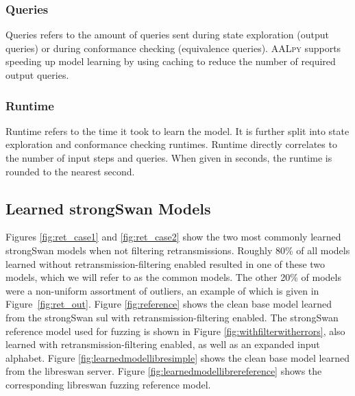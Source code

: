 \subsubsection*{Queries}
Queries refers to the amount of queries sent during state exploration (output queries) or during conformance checking (equivalence queries). \textsc{AALpy} supports speeding up model learning by using caching to reduce the number of required output queries. 

\subsubsection*{Runtime}
Runtime refers to the time it took to learn the model. It is further split into state exploration and conformance checking runtimes. Runtime directly correlates to the number of input steps and queries. When given in seconds, the runtime is rounded to the nearest second.


\subsection{Learned strongSwan Models} \label{subsec:models}
Figures \ref{fig:ret_case1} and \ref{fig:ret_case2} show the two most commonly learned strongSwan models when not filtering retransmissions. Roughly 80\% of all models learned without retransmission-filtering enabled resulted in one of these two models, which we will refer to as the common models. The other 20\% of models were a non-uniform assortment of outliers, an example of which is given in Figure~\ref{fig:ret_out}. Figure \ref{fig:reference} shows the clean base model learned from the strongSwan \ac{sul} with retransmission-filtering enabled. The strongSwan reference model used for fuzzing is shown in Figure \ref{fig:withfilterwitherrors}, also learned with retransmission-filtering enabled, as well as an expanded input alphabet. Figure \ref{fig:learnedmodellibresimple} shows the clean base model learned from the libreswan server. Figure \ref{fig:learnedmodellibrereference} shows the corresponding libreswan fuzzing reference model. 


